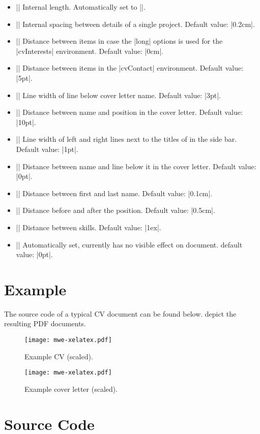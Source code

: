 \documentclass{ltxdoc}
\begin{document}
\begin{itemize}
  \item |\cv@projectSep| Internal length. Automatically set to |\cvItemSep|.
  \item |\cvProjectDetailsSep| Internal spacing between details of a single project. Default value: |0.2cm|.
  \item |\cvInterestDetailsSep| Distance between items in case the |long| options is used for the |cvInterests| environment. Default value: |0cm|.
  \item |\cvContactItemSep| Distance between items in the |cvContact| environment. Default value: |5pt|.
  \item |\cvCoverLetterLineWidth| Line width of line below cover letter name. Default value: |3pt|.
  \item |\cvCoverLetterPositionSpacing| Distance between name and position in the cover letter. Default value: |10pt|.
  \item |\cvSBSectionLineWidth| Line width of left and right lines next to the titles of in the side bar. Default value: |1pt|.
  \item |\cvCoverLetterLineSpacing| Distance between name and line below it in the cover letter. Default value: |0pt|.
  \item |\cvIDNameSep| Distance between first and last name. Default value: |0.1cm|.
  \item |\cvPositionSep| Distance before and after the position. Default value: |0.5cm|.
  \item |\cvSkillSep| Distance between skills. Default value: |1ex|.
  \item |\cvHeaderIconWidth| Automatically set, currently has no visible effect on document. default value: |0pt|.
\end{itemize}
  
  
\section{Example}

  The source code of a typical CV document can be found below.  depict the resulting PDF documents.

  \begin{figure}[!ht]
    \texttt{[image: mwe-xelatex.pdf]}
    \caption{Example CV (scaled).}
    \label{example-cv}
  \end{figure}

  \begin{figure}[!ht]
    \texttt{[image: mwe-xelatex.pdf]}
    \caption{Example cover letter (scaled).}
    \label{example-cover-letter}
  \end{figure}

  

\section{Source Code}



\PrintIndex
\end{document}
